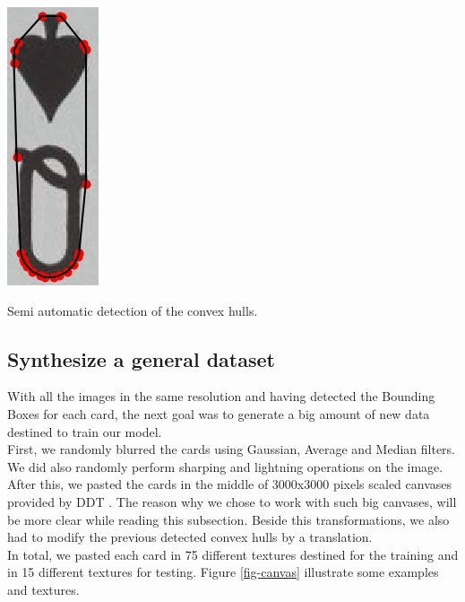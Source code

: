 \documentclass[a4paper]{article}
\begin{document}
\begin{minipage}{\columnwidth}
{\includegraphics[scale=0.74]{images/qs_2_2}  }
\caption{Semi automatic detection of the convex hulls.}
\label{fig-data-prep}
\end{minipage}

\subsection{Synthesize a general dataset}
With all the images in the same resolution and having detected the Bounding Boxes for each card, the next goal was to generate a big amount of new data destined to train our model. \\
First, we randomly blurred the cards using Gaussian, Average and Median filters.  We did also randomly perform sharping and lightning operations on the image.  After this, we pasted the cards in the middle of 3000x3000 pixels scaled canvases provided by DDT \cite{cimpoi14describing}.  The reason why we chose to work with such big canvases, will be more clear while reading this subsection.  Beside this transformations, we also had to modify the previous detected convex hulls by a translation.\\
In total, we pasted each card in 75 different textures destined for the training and in 15 different textures for testing.  Figure \ref{fig-canvas} illustrate some examples and textures. \\ \\
\end{document}
